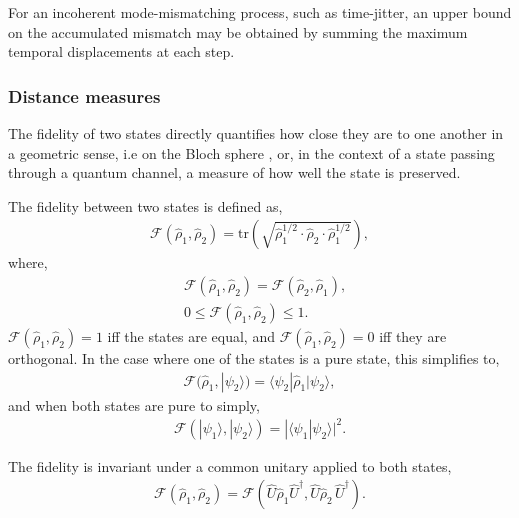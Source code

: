 \documentclass[aps, rmp, twocolumn, amsmath, amssymb, nofootinbib, superscriptaddress, longbibliography, floatfix, table-of-contents, eqsecnum]{revtex4-1}
\newcommand{\bra}[1]{\langle#1|}
\newcommand{\ket}[1]{|#1\rangle}
\begin{document}
For an incoherent mode-mismatching process, such as time-jitter, an upper bound on the accumulated mismatch may be obtained by summing the maximum temporal displacements at each step.

%
%

\subsubsection{Distance measures} \label{sec:fid_metric} 

The fidelity of two states directly quantifies how close they are to one another in a geometric sense, i.e on the Bloch sphere \cite{???}, or, in the context of a state passing through a quantum channel, a measure of how well the state is preserved.

The fidelity between two states is defined as,
\begin{align}
\mathcal{F}(\hat\rho_1,\hat\rho_2) = \text{tr}\left(\sqrt{\hat\rho_1^{1/2}\cdot\hat\rho_2\cdot\hat\rho_1^{1/2}}\right),
\end{align}
where,
\begin{align}
& \mathcal{F}(\hat\rho_1,\hat\rho_2) = \mathcal{F}(\hat\rho_2,\hat\rho_1), \nonumber \\
& 0\leq \mathcal{F}(\hat\rho_1,\hat\rho_2) \leq 1.
\end{align}
\mbox{$\mathcal{F}(\hat\rho_1,\hat\rho_2)=1$} iff the states are equal, and \mbox{$\mathcal{F}(\hat\rho_1,\hat\rho_2)=0$} iff they are orthogonal.
In the case where one of the states is a pure state, this simplifies to,
\begin{align}
\mathcal{F}(\hat\rho_1,\ket{\psi_2}) = \bra{\psi_2}\hat\rho_1\ket{\psi_2},
\end{align}
and when both states are pure to simply,
\begin{align}
\mathcal{F}(\ket{\psi_1},\ket{\psi_2}) = |\langle\psi_1 | \psi_2\rangle|^2.
\end{align}

The fidelity is invariant under a common unitary applied to both states,
\begin{align}
\mathcal{F}(\hat\rho_1,\hat\rho_2) = \mathcal{F}(\hat{U}\hat\rho_1 \hat{U}^\dag,\hat{U} \hat\rho_2\,\hat{U}^\dag).
\end{align}
\end{document}
